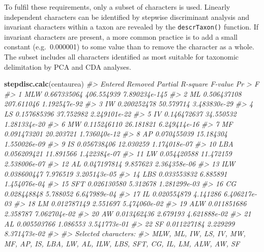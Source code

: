 \documentclass[
]{article}
\newenvironment{Shaded}{\begin{snugshade}}{\end{snugshade}}
\newcommand{\CommentTok}[1]{\textcolor[rgb]{0.56,0.35,0.01}{\textit{#1}}}
\newcommand{\KeywordTok}[1]{\textcolor[rgb]{0.13,0.29,0.53}{\textbf{#1}}}
\newcommand{\NormalTok}[1]{#1}
\begin{document}
To fulfil these requirements, only a subset of characters is used.
Linearly independent characters can be identified by stepwise
discriminant analysis and invariant characters within a taxon are
revealed by the \texttt{descrTaxon()} function. If invariant characters
are present, a more common practice is to add a small constant
(e.g.~0.000001) to some value than to remove the character as a whole.
The subset includes all characters identified as most suitable for
taxonomic delimitation by PCA and CDA analyses.

\begin{Shaded}
\begin{Highlighting}[]
\KeywordTok{stepdisc.calc}\NormalTok{(centaurea)}
\CommentTok{#>    Entered Removed Partial R-square    F-value        Pr > F}
\CommentTok{#> 1      MLW              0.667335064 406.554939 7.890234e-145}
\CommentTok{#> 2       ML              0.506437108 207.611046  1.192547e-92}
\CommentTok{#> 3       IW              0.200252478  50.579714  3.483830e-29}
\CommentTok{#> 4       LS              0.157685396  37.752982  2.249101e-22}
\CommentTok{#> 5       IV              0.146472637  34.550532  1.281334e-20}
\CommentTok{#> 6       MW              0.115246110  26.181821  6.249414e-16}
\CommentTok{#> 7       MF              0.091473201  20.203721  1.736040e-12}
\CommentTok{#> 8       AP              0.070455039  15.184304  1.550026e-09}
\CommentTok{#> 9       IS              0.056738406  12.030259  1.174018e-07}
\CommentTok{#> 10     LBA              0.056209421  11.891566  1.422384e-07}
\CommentTok{#> 11      LW              0.054420588  11.472159  2.538006e-07}
\CommentTok{#> 12      AL              0.047197814   9.857623  2.364358e-06}
\CommentTok{#> 13     ILW              0.038600447   7.976519  3.205143e-05}
\CommentTok{#> 14     LBS              0.033553832   6.885891  1.454076e-04}
\CommentTok{#> 15     SFT              0.026130580   5.312678  1.281299e-03}
\CommentTok{#> 16      CG              0.028448848   5.788052  6.647989e-04}
\CommentTok{#> 17      IL              0.020554879   4.141286  6.406217e-03}
\CommentTok{#> 18      LM              0.012787149   2.551697  5.474060e-02}
\CommentTok{#> 19     ALW              0.011851686   2.358787  7.062704e-02}
\CommentTok{#> 20      AW              0.013462436   2.679193  4.621888e-02}
\CommentTok{#> 21              AL      0.005503766   1.086553  3.541773e-01}
\CommentTok{#> 22      SF              0.011227184   2.229299  8.371473e-02}
\CommentTok{#> }
\CommentTok{#> Selected characters:}
\CommentTok{#> MLW, ML, IW, LS, IV, MW, MF, AP, IS, LBA, LW, AL, ILW, LBS, SFT, CG, IL, LM, ALW, AW, SF}


\end{Highlighting}
\end{Shaded}
\end{document}
